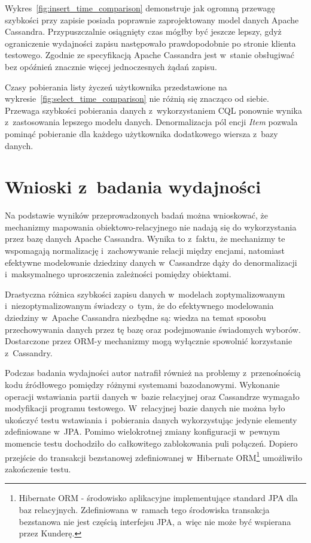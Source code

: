 Wykres~\ref{fig:insert_time_comparison} demonstruje jak ogromną przewagę szybkości przy zapisie posiada poprawnie zaprojektowany model danych Apache Cassandra. Przypuszczalnie osiągnięty czas mógłby być jeszcze lepszy, gdyż ograniczenie wydajności zapisu następowało prawdopodobnie po stronie klienta testowego. Zgodnie ze specyfikacją Apache Cassandra jest w~stanie obsługiwać bez opóźnień znacznie więcej jednoczesnych żądań zapisu.

Czasy pobierania listy życzeń użytkownika przedstawione na wykresie~\ref{fig:select_time_comparison} nie różnią się znacząco od siebie. Przewaga szybkości pobierania danych z~wykorzystaniem CQL ponownie wynika z~zastosowania lepszego modelu danych. Denormalizacja pól encji \emph{Item} pozwala pominąć pobieranie dla każdego użytkownika dodatkowego wiersza z~bazy danych. 

\section{Wnioski z~badania wydajności}
\label{sec:cassandra_orm_performance_summary}

Na podstawie wyników przeprowadzonych badań można wnioskować, że mechanizmy mapowania obiektowo-relacyjnego nie nadają się do wykorzystania przez bazę danych Apache Cassandra. Wynika to z~faktu, że mechanizmy te wspomagają normalizację i~zachowywanie relacji między encjami, natomiast efektywne modelowanie dziedziny danych w~Cassandrze dąży do denormalizacji i~maksymalnego uproszczenia zależności pomiędzy obiektami.

Drastyczna różnica szybkości zapisu danych w~modelach zoptymalizowanym i~niezoptymalizowanym świadczy o~tym, że do efektywnego modelowania dziedziny w~Apache Cassandra niezbędne są: wiedza na temat sposobu przechowywania danych przez tę bazę oraz podejmowanie świadomych wyborów. Dostarczone przez ORM-y mechanizmy mogą wyłącznie spowolnić korzystanie z~Cassandry.

Podczas badania wydajności autor natrafił również na problemy z~przenośnością kodu źródłowego pomiędzy różnymi systemami bazodanowymi. Wykonanie operacji wstawiania partii danych w~bazie relacyjnej oraz Cassandrze wymagało modyfikacji programu testowego. W~relacyjnej bazie danych nie można było ukończyć testu wstawiania i~pobierania danych wykorzystując jedynie elementy zdefiniowane w~JPA. Pomimo wielokrotnej zmiany konfiguracji w~pewnym momencie testu dochodziło do całkowitego zablokowania puli połączeń. Dopiero przejście do transakcji bezstanowej zdefiniowanej w~Hibernate ORM\footnote{Hibernate ORM - środowisko aplikacyjne implementujące standard JPA dla baz relacyjnych. Zdefiniowana w~ramach tego środowiska transakcja bezstanowa nie jest częścią interfejsu JPA, a~więc nie może być wspierana przez Kunderę.} umożliwiło zakończenie testu.

